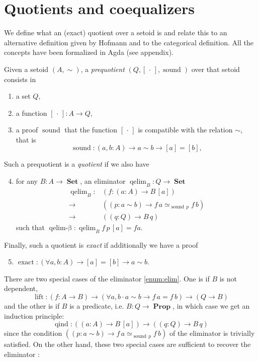 \documentclass[envcountsame]{llncs}
\newcommand{\dotph}{\,\cdot\,} %
\providecommand{\class}[1]{[#1]}
\DeclareMathOperator{\Prop}{\mathbf{Prop}}
\DeclareMathOperator{\Set}{\mathbf{Set}}
\DeclareMathOperator{\sound}{sound}
\DeclareMathOperator{\qelimbeta}{qelim-\beta}
\DeclareMathOperator{\qind}{qind}
\DeclareMathOperator{\exact}{exact}
\DeclareMathOperator{\qelim}{qelim}
\DeclareMathOperator{\lift}{lift}
\renewcommand{\equiv}{=}
\begin{document}
\section{Quotients and coequalizers}\label{sec:quotients}

We define what an (exact) quotient over a setoid is and relate this to
an alternative definition given by Hofmann and to the categorical
definition. All the concepts have been formalized in Agda (see appendix).

\begin{definition}
\label{def:quotient}

\noindent
Given a setoid $(A,\sim)$,  a \emph{prequotient} $(Q,\class\dotph,\sound)$ over that setoid consists in
\begin{enumerate}
\item \label{enum:Q} a set $Q$,
\item \label{enum:box}a function $\class\dotph\colon A \to Q$,
\item \label{enum:sound} a proof $\sound$ that  the function $\class\dotph$ is compatible with the relation $\sim$,
that is \[\sound\colon (a,b : A) \to a\sim b \to [a] = [b],\]
\end{enumerate}
Such a prequotient is a \emph{quotient} if  we also have\begin{enumerate}
\setcounter{enumi}{3}
\item \label{enum:elim}
for any $B\colon A\to\Set$, an eliminator $\qelim_B: Q\to\Set$
 \begin{align*}
 \qelim_B\colon &(f\colon (a:A) \to B\,\class a) \\
        {\to}\, &((p:a\sim b) \to f\,a \simeq_{\sound\,p}f\,b)\\
        {\to}\, &((q:Q) \to B\,q)
 \end{align*}
such that $\qelimbeta\colon \qelim_B f \,p\,\class a\equiv f a$.

\end{enumerate}
Finally, such a quotient is \emph{exact} if additionally
we have
a proof\begin{enumerate}
\setcounter{enumi}{4}
\item $\exact :(\forall a,b : A) \to  \class a \equiv \class b \to a \sim b$.

\end{enumerate}
\end{definition}

There are two special cases of the eliminator \ref{enum:elim}. One is if $B$ is not dependent,
 \[\lift\colon (f\colon A \to B) \to (\forall a,b\cdot a\sim b \to f\,a \equiv f\,b) \to (Q \to B)\]
and the other is if $B$ is a predicate, i.e. $B : Q\to \Prop$, in which case we get an induction principle:
\[\qind \colon((a\colon A)\to B \,\class a)\to ((q\colon Q)\to B\,q)\]
since the condition $((p:a\sim b) \to f\,a \simeq_{\sound\,p}f\,b) $  of  the eliminator is trivially satisfied.
On the other hand, these two special cases are sufficient to recover the eliminator :
\end{document}
